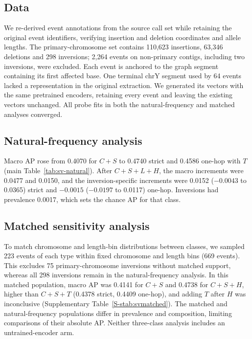 \documentclass[11pt]{article}
\begin{document}
\begin{bibunit}[unsrtnat]
\subsection{Data}
We re-derived event annotations from the source call set while retaining the original event identifiers, verifying insertion and deletion coordinates and allele lengths. The primary-chromosome set contains 110,623 insertions, 63,346 deletions and 298 inversions; 2,264 events on non-primary contigs, including two inversions, were excluded. Each event is anchored to the graph segment containing its first affected base. One terminal chrY segment used by 64 events lacked a representation in the original extraction. We generated its vectors with the same pretrained encoders, retaining every event and leaving the existing vectors unchanged. All probe fits in both the natural-frequency and matched analyses converged.

\subsection{Natural-frequency analysis}
Macro AP rose from 0.4070 for $C+S$ to 0.4740 strict and 0.4586 one-hop with $T$ (main Table~\ref{tab:sv-natural}). After $C+S+L+H$, the macro increments were 0.0477 and 0.0150, and the inversion-specific increments were 0.0152 ($-0.0043$ to 0.0365) strict and $-0.0015$ ($-0.0197$ to 0.0117) one-hop. Inversions had prevalence 0.0017, which sets the chance AP for that class.

\subsection{Matched sensitivity analysis}
To match chromosome and length-bin distributions between classes, we sampled 223 events of each type within fixed chromosome and length bins (669 events). This excludes 75 primary-chromosome inversions without matched support, whereas all 298 inversions remain in the natural-frequency analysis. In this matched population, macro AP was 0.4141 for $C+S$ and 0.4738 for $C+S+H$, higher than $C+S+T$ (0.4378 strict, 0.4409 one-hop), and adding $T$ after $H$ was inconclusive (Supplementary Table~\ref{S-stab:svmatched}). The matched and natural-frequency populations differ in prevalence and composition, limiting comparisons of their absolute AP. Neither three-class analysis includes an untrained-encoder arm.


\end{bibunit}
\end{document}
